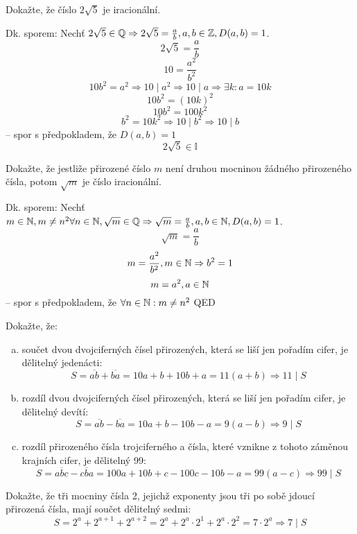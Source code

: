 \begin{example}[SÚM 109/38]
  Dokažte, že číslo $2\sqrt{5}$ je iracionální.

  Dk. sporem: Nechť $2\sqrt{5} \in \mathbb{Q} \Rightarrow 2\sqrt{5} = \frac{a}{b}, a, b \in \mathbb{Z}, D(a, b) = 1$.
  $$2\sqrt{5} = \frac{a}{b}$$
  $$10 = \frac{a^2}{b^2}$$
  $$10b^2 = a^2 \Rightarrow 10 \mid a^2 \Rightarrow 10 \mid a \Rightarrow \exists k: a = 10k$$
  $$10b^2 = (10k)^2$$
  $$10b^2 = 100k^2$$
  $$b^2 = 10k^2 \Rightarrow 10 \mid b^2 \Rightarrow 10 \mid b$$ -- spor s předpokladem, že $D(a, b) = 1$
  $$2\sqrt{5} \in \mathbb{I}$$
\end{example}

\begin{example}[SÚM 109/39]
  Dokažte, že jestliže přirozené číslo $m$ není druhou mocninou žádného přirozeného čísla, potom $\sqrt{m}$ je číslo iracionální.

  Dk. sporem: Nechť $m \in \mathbb{N}, m \neq n^2 \forall n \in \mathbb{N}, \sqrt{m} \in \mathbb{Q} \Rightarrow \sqrt{m} = \frac{a}{b}, a, b \in \mathbb{N}, D(a, b) = 1$.
  $$\sqrt{m} = \frac{a}{b}$$
  $$m = \frac{a^2}{b^2}, m \in \mathbb{N} \Rightarrow b^2 = 1$$
  $$m = a^2, a \in \mathbb{N}$$ -- spor s předpokladem, že $\forall n \in \mathbb{N}: m \neq n^2 $
  QED
\end{example}

\begin{example}[SÚM 144/301]
  Dokažte, že:
  \begin{enumerate}[a.]
    \item součet dvou dvojciferných čísel přirozených, která se liší jen pořadím cifer, je dělitelný jedenácti: $$S = \overline{ab} + \overline{ba} = 10a + b + 10b + a = 11(a + b) \Rightarrow 11 \mid S$$
    \item rozdíl dvou dvojciferných čísel přirozených, která se liší jen pořadím cifer, je dělitelný devítí: $$S = \overline{ab} - \overline{ba} = 10a + b - 10b - a = 9(a - b) \Rightarrow 9 \mid S$$
    \item rozdíl přirozeného čísla trojciferného  a čísla, které vznikne z tohoto záměnou krajních cifer, je dělitelný 99: $$S = \overline{abc} - \overline{cba} = 100a + 10b + c - 100c - 10b - a = 99(a - c) \Rightarrow 99 \mid S$$
  \end{enumerate}
\end{example}

\begin{example}[SÚM 145/303]
  Dokažte, že tři mocniny čísla 2, jejichž exponenty jsou tři po sobě jdoucí přirozená čísla, mají součet dělitelný sedmi: $$S = 2^a + 2^{a+1} + 2^{a+2} = 2^a + 2^a\cdot2^1 + 2^a\cdot2^2 = 7\cdot2^a \Rightarrow 7 \mid S$$
\end{example}

